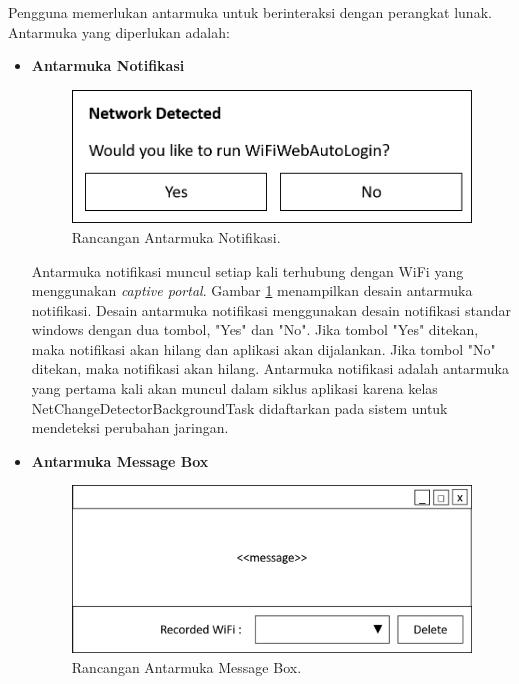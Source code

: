 \documentclass[a4paper,twoside]{article}
\begin{document}
\begin{enumerate}
\begin{itemize}
{                Pengguna memerlukan antarmuka untuk berinteraksi dengan perangkat lunak. Antarmuka yang diperlukan adalah:
                \begin{itemize}
                    \item{
                        {\bf Antarmuka Notifikasi}
                        \begin{figure}[!htb]
                            \centering
                            \includegraphics[scale=0.5]{UI_Notification.png}
                            \caption[Rancangan Antarmuka Notifikasi.]{Rancangan Antarmuka Notifikasi.}
                            \label{fig:RancanganAntarmukaNotifikasi}
                        \end{figure}

                        Antarmuka notifikasi muncul setiap kali terhubung dengan WiFi yang menggunakan \textit{captive portal}. Gambar \ref{fig:RancanganAntarmukaNotifikasi} menampilkan desain antarmuka notifikasi. Desain antarmuka notifikasi menggunakan desain notifikasi standar windows dengan dua tombol, "Yes" dan "No". Jika tombol "Yes" ditekan, maka notifikasi akan hilang dan aplikasi akan dijalankan. Jika tombol "No" ditekan, maka notifikasi akan hilang. Antarmuka notifikasi adalah antarmuka yang pertama kali akan muncul dalam siklus aplikasi karena kelas NetChangeDetectorBackgroundTask didaftarkan pada sistem untuk mendeteksi perubahan jaringan.
                    }
                    \item{
                        {\bf Antarmuka Message Box}
                        \begin{figure}[!htb]
                            \centering
                            \includegraphics[scale=0.5]{UI_MessageBox.png}
                            \caption[Rancangan Antarmuka Message Box.]{Rancangan Antarmuka Message Box.}
                            \label{fig:RancanganAntarmukaMessageBox}
                        \end{figure}

}
\end{itemize}}
\end{itemize}
\end{enumerate}
\end{document}

